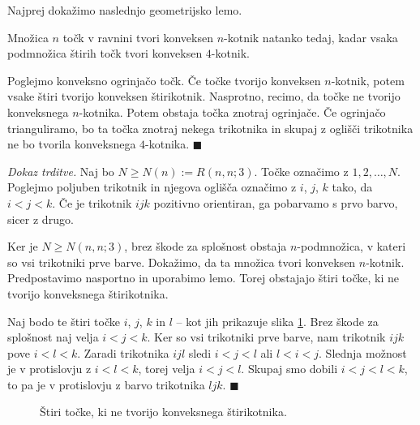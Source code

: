 \documentclass[twoside,11pt]{article}
\begin{document}
Najprej dokažimo naslednjo geometrijsko lemo.
\begin{lema}
    Množica $n$ točk v ravnini tvori konveksen $n$-kotnik natanko tedaj, kadar
    vsaka podmnožica štirih točk tvori konveksen $4$-kotnik.
\end{lema}
\begin{dokaz}
    Poglejmo konveksno ogrinjačo točk. Če točke tvorijo konveksen $n$-kotnik, potem vsake 
    štiri tvorijo konveksen štirikotnik. Nasprotno, recimo, da točke ne tvorijo konveksnega 
    $n$-kotnika. Potem obstaja točka znotraj ogrinjače. Če ogrinjačo trianguliramo, bo ta 
    točka znotraj nekega trikotnika in skupaj z oglišči trikotnika ne bo tvorila 
    konveksnega $4$-kotnika. \hfill $\blacksquare$
\end{dokaz}

\noindent\textit{Dokaz trditve.}
    Naj bo $N \ge N(n) := R(n,n;3)$. Točke označimo z $1, 2, \dots, N$. 
    Poglejmo poljuben trikotnik in njegova oglišča označimo z $i$, $j$, $k$ tako, da $i < j < k$. Če je 
    trikotnik $ijk$ pozitivno orientiran, ga pobarvamo s prvo barvo, sicer z drugo.

    Ker je $N \ge N(n,n;3)$, brez škode za splošnost obstaja $n$-podmnožica, v kateri so 
    vsi trikotniki prve barve. Dokažimo, da ta množica tvori konveksen $n$-kotnik. Predpostavimo 
    nasportno in uporabimo lemo. Torej obstajajo štiri točke, ki ne tvorijo konveksnega 
    štirikotnika. %

    Naj bodo te štiri točke $i$, $j$, $k$ in $l$ -- kot jih prikazuje slika \ref{fig:happy}. 
    Brez škode za splošnost naj velja $i < j < k$. Ker so vsi trikotniki prve barve, nam 
    trikotnik $ijk$ pove $i < l < k$. Zaradi trikotnika  $ijl$ sledi $i < j < l$ 
    ali $l < i < j$. Slednja možnost je v protislovju z $i < l < k$, torej velja $i < j < l$. Skupaj 
    smo dobili $i < j < l < k$, to pa je v protislovju z barvo trikotnika 
    $ljk$. \hfill $\blacksquare$

    \begin{figure}[h!]
        \centering
        \caption{Štiri točke, ki ne tvorijo konveksnega štirikotnika.}
        \label{fig:happy}
    \end{figure}
\end{document}
